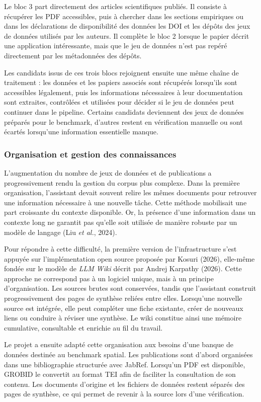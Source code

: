 \documentclass[11pt,a4paper]{article}
\begin{document}
Le bloc 3 part directement des articles scientifiques publiés. Il consiste à récupérer les PDF accessibles, puis à chercher dans les sections empiriques ou dans les déclarations de disponibilité des données les DOI et les dépôts des jeux de données utilisés par les auteurs. Il complète le bloc 2 lorsque le papier décrit une application intéressante, mais que le jeu de données n'est pas repéré directement par les métadonnées des dépôts.

Les candidats issus de ces trois blocs rejoignent ensuite une même chaîne de traitement : les données et les papiers associés sont récupérés lorsqu'ils sont accessibles légalement, puis les informations nécessaires à leur documentation sont extraites, contrôlées et utilisées pour décider si le jeu de données peut continuer dans le pipeline. Certains candidats deviennent des jeux de données préparés pour le benchmark, d'autres restent en vérification manuelle ou sont écartés lorsqu'une information essentielle manque.


\subsubsection{Organisation et gestion des connaissances}

L'augmentation du nombre de jeux de données et de publications a progressivement rendu la gestion du corpus plus complexe. Dans la première organisation, l'assistant devait souvent relire les mêmes documents pour retrouver une information nécessaire à une nouvelle tâche. Cette méthode mobilisait une part croissante du contexte disponible. Or, la présence d'une information dans un contexte long ne garantit pas qu'elle soit utilisée de manière robuste par un modèle de langage (Liu \textit{et al.}, 2024).

Pour répondre à cette difficulté, la première version de l'infrastructure s'est appuyée sur l'implémentation open source proposée par Kosuri (2026), elle-même fondée sur le modèle de \textit{LLM Wiki} décrit par Andrej Karpathy (2026). Cette approche ne correspond pas à un logiciel unique, mais à un principe d'organisation. Les sources brutes sont conservées, tandis que l'assistant construit progressivement des pages de synthèse reliées entre elles. Lorsqu'une nouvelle source est intégrée, elle peut compléter une fiche existante, créer de nouveaux liens ou conduire à réviser une synthèse. Le wiki constitue ainsi une mémoire cumulative, consultable et enrichie au fil du travail.

Le projet a ensuite adapté cette organisation aux besoins d'une banque de données destinée au benchmark spatial. Les publications sont d'abord organisées dans une bibliographie structurée avec JabRef. Lorsqu'un PDF est disponible, GROBID le convertit au format TEI afin de faciliter la consultation de son contenu. Les documents d'origine et les fichiers de données restent séparés des pages de synthèse, ce qui permet de revenir à la source lors d'une vérification.
\end{document}
